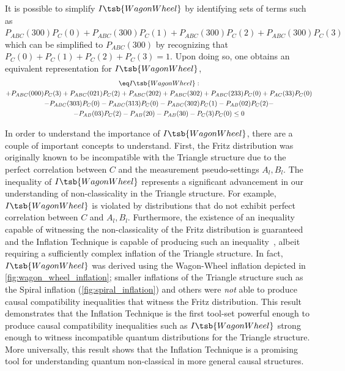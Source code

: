 \documentclass[aps, 10pt, english, twoside, pra, nofootinbib, tightenlines, longbibliography, superscriptaddress]{revtex4-1}
\begin{document}
    It is possible to simplify $I\tsb{WagonWheel}$ by identifying sets of terms such as $P_{ABC}(300)P_{C}(0) + P_{ABC}(300)P_{C}(1) + P_{ABC}(300)P_{C}(2) + P_{ABC}(300)P_{C}(3)$ which can be simplified to $P_{ABC}(300)$ by recognizing that $P_{C}(0) + P_{C}(1) + P_{C}(2) + P_{C}(3) = 1$. Upon doing so, one obtains an equivalent representation for $I\tsb{WagonWheel}$,
    \begin{equation*}
    \begin{gathered}
    \eq\label{eq:ww_ineq_symplified}
    I\tsb{WagonWheel} : \\
    + P_{ABC}(000)P_{C}(3) + P_{ABC}(021)P_{C}(2) + P_{ABC}(202) + P_{ABC}(302) + P_{ABC}(233)P_{C}(0) + P_{AC}(33)P_{C}(0) \\
    - P_{ABC}(303)P_{C}(0) - P_{ABC}(313)P_{C}(0) - P_{ABC}(302)P_{C}(1) - P_{AB}(02)P_{C}(2) - \\
    - P_{AB}(03)P_{C}(2) - P_{AB}(20) - P_{AB}(30) - P_{C}(3)P_{C}(0) \leq 0
    \end{gathered}
    \end{equation*}

    In order to understand the importance of $I\tsb{WagonWheel}$, there are a couple of important concepts to understand. First, the Fritz distribution was originally known to be incompatible with the Triangle structure due to the perfect correlation between $C$ and the measurement pseudo-settings $A_l, B_l$. The inequality of $I\tsb{WagonWheel}$ represents a significant advancement in our understanding of non-classicality in the Triangle structure. For example, $I\tsb{WagonWheel}$ is violated by distributions that do not exhibit perfect correlation between $C$ and $A_l, B_l$. Furthermore, the existence of an inequality capable of witnessing the non-classicality of the Fritz distribution is guaranteed and the Inflation Technique is capable of producing such an inequality~\cite{Navascues_2017}, albeit requiring a sufficiently complex inflation of the Triangle structure. In fact, $I\tsb{WagonWheel}$ was derived using the Wagon-Wheel inflation depicted in \cref{fig:wagon_wheel_inflation}; smaller inflations of the Triangle structure such as the Spiral inflation (\cref{fig:spiral_inflation}) and others were \textit{not} able to produce causal compatibility inequalities that witness the Fritz distribution. This result demonstrates that the Inflation Technique is the first tool-set powerful enough to produce causal compatibility inequalities such as $I\tsb{WagonWheel}$ strong enough to witness incompatible quantum distributions for the Triangle structure. More universally, this result shows that the Inflation Technique is a promising tool for understanding quantum non-classical in more general causal structures.
\end{document}
